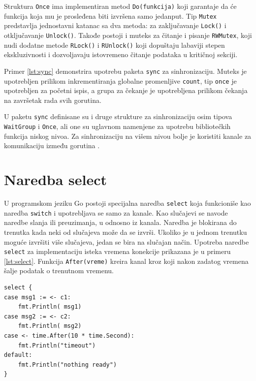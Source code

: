 \documentclass[12pt,oneside]{memoir}
\begin{document}
Struktura \texttt{Once} ima implementiran metod \texttt{Do(funkcija)} koji garantaje da će funkcija koja mu je prosleđena biti izvršena samo jedanput. Tip  \texttt{Mutex} predstavlja jednostavni katanac sa dva metoda: za zaključavanje \texttt{Lock()} i otključavanje \texttt{Unlock()}. Takođe postoji i muteks za čitanje i pisanje \texttt{RWMutex}, koji nudi dodatne metode \texttt{RLock()} i \texttt{RUnlock()} koji dopuštaju labaviji stepen ekskluzivnosti i dozvoljavaju istovremeno čitanje podataka u kritičnoj sekciji.

Primer \ref{lst:sync} demonstrira upotrebu paketa \texttt{sync} za sinhronizaciju. Muteks je upotrebljen prilikom inkrementiranja globalne promenljive \texttt{count}, tip \texttt{once} je upotrebljen za početni ispis, a grupa za čekanje je upotrebljena prilikom čekanja na završetak rada svih gorutina.

U paketu \texttt{sync} definisane su i druge strukture za sinhronizaciju osim tipova \texttt{WaitGroup}  i \texttt{Once}, ali one su uglavnom namenjene za upotrebu bibliotečkih funkcija niskog nivoa. Za sinhronizaciju na višem nivou bolje je koristiti kanale za komunikaciju između gorutina \cite{sync}. 

\section{Naredba select}

U programskom jeziku Go postoji specijalna naredba \texttt{select} koja funkcioniše kao naredba \texttt{switch} i upotrebljava se samo za kanale. Kao slučajevi se navode naredbe slanja ili preuzimanja, u odnosno iz kanala. Naredba je blokirana do trenutka kada neki od slučajeva može da se izvrši. Ukoliko je u jednom trenutku moguće izvršiti  više slučajeva, jedan se bira na slučajan način. Upotreba naredbe \texttt{select} za implementaciju isteka vremena konekcije prikazana je u primeru \ref{lst:select}. Funkcija \texttt{After(vreme)} kreira kanal kroz koji nakon zadatog vremena šalje podatak o trenutnom vremenu.

\begin{center}
\begin{lstlisting}[caption=Upotreba naredbe \texttt{select}, label={lst:select},  backgroundcolor=\color{background}]
select {
case msg1 := <- c1:
	fmt.Println( msg1)
case msg2 := <- c2:
	fmt.Println( msg2)
case <- time.After(10 * time.Second):
	fmt.Println("timeout")
default:
	fmt.Println("nothing ready")
}					
\end{lstlisting}
\end{center}
\end{document}
